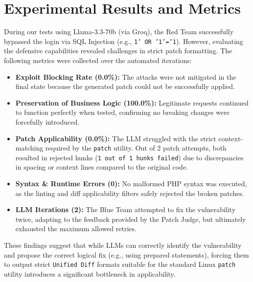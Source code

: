 \documentclass[11pt,a4paper]{article}
\begin{document}
\section{Experimental Results and Metrics}
During our tests using Llama-3.3-70b (via Groq), the Red Team successfully bypassed the login via SQL Injection (e.g., \texttt{1' OR '1'='1}). However, evaluating the defensive capabilities revealed challenges in strict patch formatting. The following metrics were collected over the automated iterations:

\begin{itemize}
    \item \textbf{Exploit Blocking Rate (0.0\%):} The attacks were not mitigated in the final state because the generated patch could not be successfully applied.
    \item \textbf{Preservation of Business Logic (100.0\%):} Legitimate requests continued to function perfectly when tested, confirming no breaking changes were forcefully introduced.
    \item \textbf{Patch Applicability (0.0\%):} The LLM struggled with the strict context-matching required by the \texttt{patch} utility. Out of 2 patch attempts, both resulted in rejected hunks (\texttt{1 out of 1 hunks failed}) due to discrepancies in spacing or context lines compared to the original code.
    \item \textbf{Syntax \& Runtime Errors (0):} No malformed PHP syntax was executed, as the linting and diff applicability filters safely rejected the broken patches.
    \item \textbf{LLM Iterations (2):} The Blue Team attempted to fix the vulnerability twice, adapting to the feedback provided by the Patch Judge, but ultimately exhausted the maximum allowed retries.
\end{itemize}

These findings suggest that while LLMs can correctly identify the vulnerability and propose the correct logical fix (e.g., using prepared statements), forcing them to output strict \texttt{Unified Diff} formats suitable for the standard Linux \texttt{patch} utility introduces a significant bottleneck in applicability.
\end{document}
